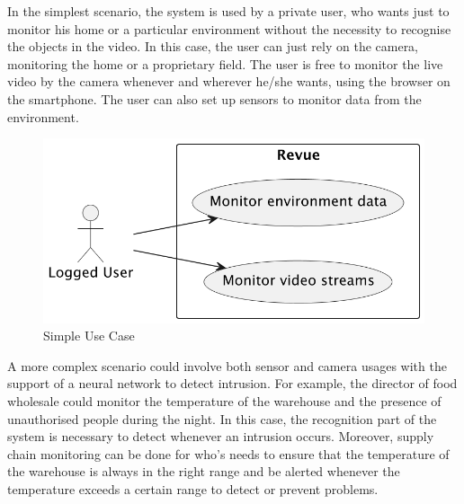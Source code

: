 \documentclass{scrartcl}
\begin{document}
    In the simplest scenario, the system is used by a private user, who wants just to monitor his home or a particular environment without the necessity
    to recognise the objects in the video. In this case, the user can just rely on the camera, monitoring the home or a proprietary field. The user is free to monitor the live video by the camera whenever and wherever he/she wants, using the browser on the smartphone.
    The user can also set up sensors to monitor data from the environment.

    \begin{figure}[h!]
        \centering
        \includegraphics[scale=0.6]{img/simple-use-case}
        \caption{Simple Use Case}
        \label{fig:simple-use-case}
    \end{figure}

    A more complex scenario could involve both sensor and camera usages with the support of a neural network to detect intrusion. For example, the director of food wholesale could
    monitor the temperature of the warehouse and the presence of unauthorised people during the night. In this case, the
    recognition part of the system is necessary to detect whenever an intrusion occurs.
    Moreover, supply chain monitoring can be done for who's needs to ensure that the temperature of
    the warehouse is always in the right range and be alerted whenever the temperature exceeds a certain range to detect or
    prevent problems.
\end{document}
